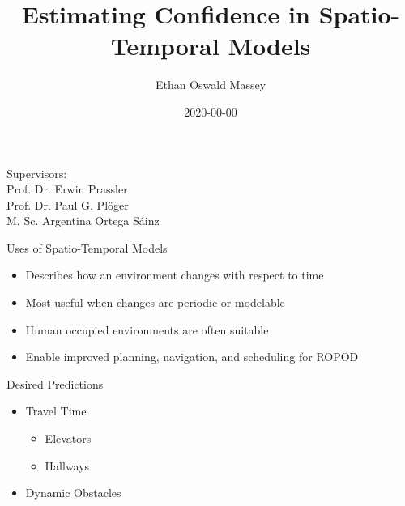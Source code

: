 \documentclass{beamer}
\author[Ethan Oswald Massey]{Ethan Oswald Massey}
\title{Estimating Confidence in Spatio-Temporal Models}
\institute[HBRS]{Hochschule Bonn-Rhein-Sieg}
\date{2020-00-00}
\begin{document}
{
\begin{frame}
\titlepage
\vspace{5mm}

Supervisors: \\ Prof. Dr. Erwin Prassler  \\ Prof. Dr. Paul G. Pl\"{o}ger \\ M. Sc. Argentina Ortega S\'{a}inz
\end{frame}
}

\begin{frame}[t]{Uses of Spatio-Temporal Models}
  \begin{itemize}
    \setlength\itemsep{1em}
    \item Describes how an environment changes with respect to time
    \item Most useful when changes are periodic or modelable
    \item Human occupied environments are often suitable
    \item Enable improved planning, navigation, and scheduling for ROPOD
  \end{itemize}

  \begin{block}{Desired Predictions}
    \begin{itemize}
    \item Travel Time
      \begin{itemize}
        \item Elevators
        \item Hallways
      \end{itemize}
    \item Dynamic Obstacles
    \end{itemize}
  \end{block}
\end{frame}
\end{document}
